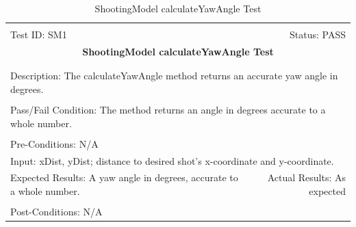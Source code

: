 \documentclass[11pt]{article}
\begin{document}
\begin{center}
\begin{table}[H]
\begin{tabular}{|l r|}\hline&\\[-2mm]
	Test ID: SM1	&Status: PASS\\[-3mm]
	\multicolumn{2}{|c|}{\textbf{\large{ShootingModel calculateYawAngle Test}}}\\&\\\hline&\\[-3mm]
	\multicolumn{2}{|p{\textwidth}|}{Description: The calculateYawAngle method returns an accurate yaw angle in degrees.}\\[1mm]\hline&\\[-3mm]
	\multicolumn{2}{|p{\textwidth}|}{Pass/Fail Condition: The method returns an angle in degrees accurate to a whole number.}\\[1mm]\hline&\\[-3mm]
	\multicolumn{2}{|p{\textwidth}|}{Pre-Conditions: N/A}\\[4mm]
	\multicolumn{2}{|p{\textwidth}|}{Input: xDist, yDist; distance to desired shot's x-coordinate and y-coordinate.}\\[2mm]\hline
	\multicolumn{1}{|p{0.49\textwidth}}{Expected Results: A yaw angle in degrees, accurate to a whole number.}	&\multicolumn{1}{|p{0.45\textwidth}|}{Actual Results: As expected}\\\hline&\\[-3mm]
	\multicolumn{2}{|p{\textwidth}|}{Post-Conditions: N/A}\\\hline
\end{tabular}
\caption{ShootingModel calculateYawAngle Test}
\end{table}
\end{center}
\end{document}
